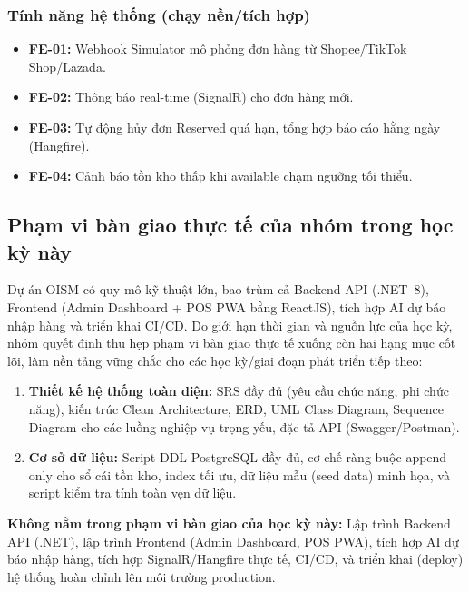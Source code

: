 \subsubsection{Tính năng hệ thống (chạy nền/tích hợp)}
\begin{itemize}
    \item \textbf{FE-01:} Webhook Simulator mô phỏng đơn hàng từ Shopee/TikTok Shop/Lazada.
    \item \textbf{FE-02:} Thông báo real-time (SignalR) cho đơn hàng mới.
    \item \textbf{FE-03:} Tự động hủy đơn Reserved quá hạn, tổng hợp báo cáo hằng ngày (Hangfire).
    \item \textbf{FE-04:} Cảnh báo tồn kho thấp khi available chạm ngưỡng tối thiểu.
\end{itemize}

\subsection{Phạm vi bàn giao thực tế của nhóm trong học kỳ này}

Dự án OISM có quy mô kỹ thuật lớn, bao trùm cả Backend API (.NET~8), Frontend (Admin Dashboard + POS PWA bằng ReactJS), tích hợp AI dự báo nhập hàng và triển khai CI/CD. Do giới hạn thời gian và nguồn lực của học kỳ, nhóm quyết định thu hẹp phạm vi bàn giao thực tế xuống còn hai hạng mục cốt lõi, làm nền tảng vững chắc cho các học kỳ/giai đoạn phát triển tiếp theo:

\begin{enumerate}
    \item \textbf{Thiết kế hệ thống toàn diện:} SRS đầy đủ (yêu cầu chức năng, phi chức năng), kiến trúc Clean Architecture, ERD, UML Class Diagram, Sequence Diagram cho các luồng nghiệp vụ trọng yếu, đặc tả API (Swagger/Postman).
    \item \textbf{Cơ sở dữ liệu:} Script DDL PostgreSQL đầy đủ, cơ chế ràng buộc append-only cho sổ cái tồn kho, index tối ưu, dữ liệu mẫu (seed data) minh họa, và script kiểm tra tính toàn vẹn dữ liệu.
\end{enumerate}

\textbf{Không nằm trong phạm vi bàn giao của học kỳ này:} Lập trình Backend API (.NET), lập trình Frontend (Admin Dashboard, POS PWA), tích hợp AI dự báo nhập hàng, tích hợp SignalR/Hangfire thực tế, CI/CD, và triển khai (deploy) hệ thống hoàn chỉnh lên môi trường production.

